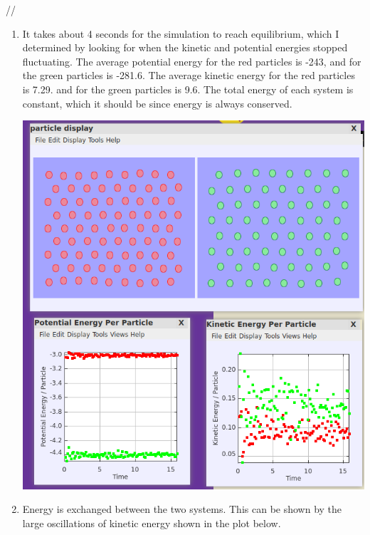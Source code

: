 \documentclass{article}
\newenvironment{problem}[2][Problem]{\begin{trivlist}
\item[\hskip \labelsep {\bfseries #1}\hskip \labelsep {\bfseries #2.}]}{\end{trivlist}}
\begin{document}
\begin{problem}{(Identification of the temperature)} //
	\begin{enumerate}[label=\alph*)]
		\item It takes about 4 seconds for the simulation to reach equilibrium, which I determined by looking for when the kinetic and potential energies stopped fluctuating. The average potential energy for the red particles is -243, and for the green particles is -281.6. The average kinetic energy for the red particles is 7.29. and for the green particles is 9.6. The total energy of each system is constant, which it should be since energy is always conserved.

			\includegraphics[scale=0.2]{2a.png}

		\item Energy is exchanged between the two systems. This can be shown by the large oscillations of kinetic energy shown in the plot below.
			

\end{enumerate}
\end{problem}
\end{document}
